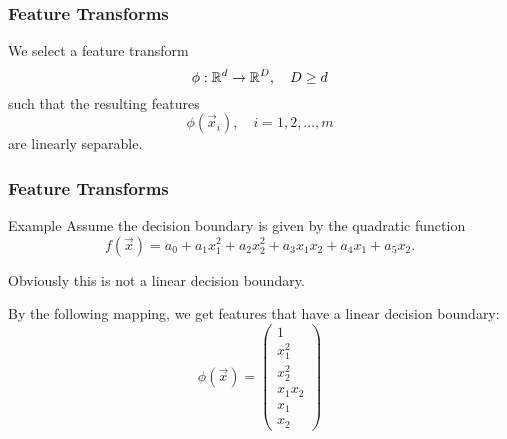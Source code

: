 \begin{frame}
  \frametitle{Feature Transforms \cont}
 
  We select a feature transform 
  \begin{displaymath}
    \phi: \mathbb{R}^d \rightarrow \mathbb{R}^D, \quad D \ge d
  \end{displaymath}
  such that the resulting features 
  \begin{displaymath}
    \phi(\vec x_i), \quad i = 1, 2, \dots, m
  \end{displaymath}
  are linearly separable.
\end{frame}


\begin{frame}
  \frametitle{Feature Transforms \cont}

  \begin{ovalblock}{Example}
    Assume the decision boundary is given by the quadratic function
    \begin{displaymath}
      f(\vec x) = a_0 + a_1 x_1^2 + a_2 x_2^2 + a_3 x_1 x_2 + a_4 x_1+a_5 x_2.
    \end{displaymath}

    Obviously this is not a linear decision boundary. \\[.25cm] \pause

    By the following mapping, we get features that have a linear decision boundary:
    \small
    \begin{displaymath}
      \phi(\vec x) = \left(\begin{array}{c}
                             1 \\ x_1^2 \\ x_2^2 \\ x_1x_2 \\ x_1 \\ x_2
                           \end{array}
                     \right)
    \end{displaymath}
  \end{ovalblock}
\end{frame}



